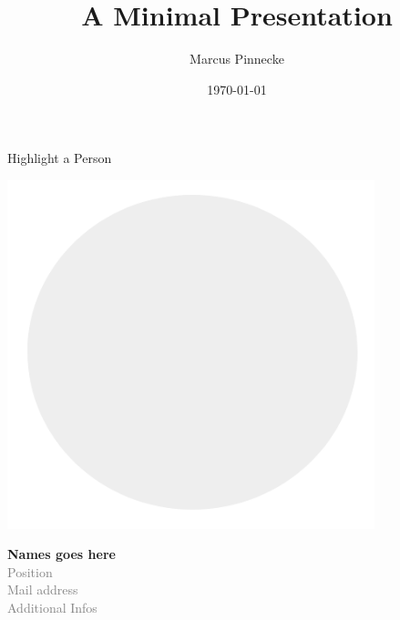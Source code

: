 \documentclass{beamer}
\title{A Minimal Presentation}
\date{\today}
\author{Marcus Pinnecke}
\institute{Metrocity Theme Headquarter}
\begin{document}
   \begin{frame}[t]{Highlight a Person}
      \begin{minipage}{0.48\linewidth}
         \flushright
            \includegraphics[width=0.8\textwidth]{highlight-person/avatar-placeholder.png}
      \end{minipage}
      \hfill
      \begin{minipage}{0.48\linewidth}
          \begin{spacing}{1.0}
             \textbf{Names goes here}\\\textcolor{gray}{{\small Position}\\{\small Mail address}\\{\small Additional Infos}}
          \end{spacing}
      \end{minipage}
  \end{frame}
\end{document}
